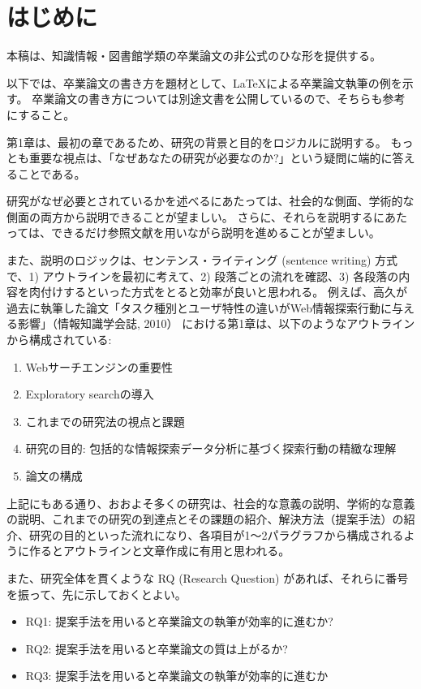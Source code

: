 \chapter{はじめに}
\label{chap:introduction}

本稿は、知識情報・図書館学類の卒業論文の非公式のひな形を提供する。

以下では、卒業論文の書き方を題材として、\LaTeX による卒業論文執筆の例を示す。
卒業論文の書き方については別途文書を公開しているので、そちらも参考にすること\cite{takaku:howto}。

第1章は、最初の章であるため、研究の背景と目的をロジカルに説明する。
もっとも重要な視点は、「なぜあなたの研究が必要なのか?」という疑問に端的に答えることである\cite{sakai:2015:korekara}。

研究がなぜ必要とされているかを述べるにあたっては、社会的な側面、学術的な側面の両方から説明できることが望ましい。
さらに、それらを説明するにあたっては、できるだけ参照文献を用いながら説明を進めることが望ましい。

また、説明のロジックは、センテンス・ライティング (sentence writing) 方式で、1) アウトラインを最初に考えて、2) 段落ごとの流れを確認、3) 各段落の内容を肉付けするといった方式をとると効率が良いと思われる。
例えば、高久が過去に執筆した論文「タスク種別とユーザ特性の違いがWeb情報探索行動に与える影響」（情報知識学会誌, 2010）\cite{takaku:2010:jsik} における第1章は、以下のようなアウトラインから構成されている:

\begin{enumerate}
    \item Webサーチエンジンの重要性
    \item Exploratory searchの導入
    \item これまでの研究法の視点と課題
    \item 研究の目的: 包括的な情報探索データ分析に基づく探索行動の精緻な理解
    \item 論文の構成
\end{enumerate}

上記にもある通り、おおよそ多くの研究は、社会的な意義の説明、学術的な意義の説明、これまでの研究の到達点とその課題の紹介、解決方法（提案手法）の紹介、研究の目的といった流れになり、各項目が1～2パラグラフから構成されるように作るとアウトラインと文章作成に有用と思われる。

また、研究全体を貫くような RQ (Research Question) があれば、それらに番号を振って、先に示しておくとよい。

\begin{itemize}
    \item RQ1: 提案手法を用いると卒業論文の執筆が効率的に進むか?
    \item RQ2: 提案手法を用いると卒業論文の質は上がるか?
    \item RQ3: 提案手法を用いると卒業論文の執筆が効率的に進むか
\end{itemize}
